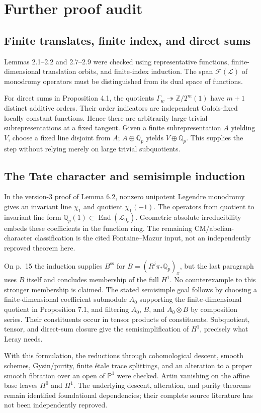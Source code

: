 \documentclass[10pt]{article}
\begin{document}
\section*{Further proof audit}
\subsection*{Finite translates, finite index, and direct sums}
Lemmas 2.1–2.2 and 2.7–2.9 were checked using representative functions, finite-dimensional translation orbits, and finite-index induction. The span \(\mathcal F(\mathcal L)\) of monodromy operators must be distinguished from its dual space of functions.\par
For direct sums in Proposition 4.1, the quotients \(\Gamma_w\twoheadrightarrow\mathbb Z/2^m(1)\) have \(m+1\) distinct additive orders. Their order indicators are independent Galois-fixed locally constant functions. Hence there are arbitrarily large trivial subrepresentations at a fixed tangent. Given a finite subrepresentation \(A\) yielding \(V\), choose a fixed line disjoint from \(A\); \(A\oplus\mathbb Q_p\) yields \(V\oplus\mathbb Q_p\). This supplies the step without relying merely on large trivial subquotients.\par
\subsection*{The Tate character and semisimple induction}
In the version-3 proof of Lemma 6.2, nonzero unipotent Legendre monodromy gives an invariant line \(\chi_1\) and quotient \(\chi_1(-1)\). The operators from quotient to invariant line form \(\mathbb Q_p(1)\subset\operatorname{End}(\mathcal L_{0_v})\). Geometric absolute irreducibility embeds these coefficients in the function ring. The remaining CM/abelian-character classification is the cited Fontaine–Mazur input, not an independently reproved theorem here.\par
On p. 15 the induction supplies \(B^{\mathrm{ss}}\) for \(B=(R^j\pi_*\mathbb Q_p)_x\), but the last paragraph uses \(B\) itself and concludes membership of the full \(H^1\). No counterexample to this stronger membership is claimed. The stated semisimple goal follows by choosing a finite-dimensional coefficient submodule \(A_0\) supporting the finite-dimensional quotient in Proposition 7.1, and filtering \(A_0\), \(B\), and \(A_0\otimes B\) by composition series. Their constituents occur in tensor products of constituents. Subquotient, tensor, and direct-sum closure give the semisimplification of \(H^1\), precisely what Leray needs.\par
With this formulation, the reductions through cohomological descent, smooth schemes, Gysin/purity, finite étale trace splittings, and an alteration to a proper smooth fibration over an open of \(\mathbb P^1\) were checked. Artin vanishing on the affine base leaves \(H^0\) and \(H^1\). The underlying descent, alteration, and purity theorems remain identified foundational dependencies; their complete source literature has not been independently reproved.\par
\end{document}
